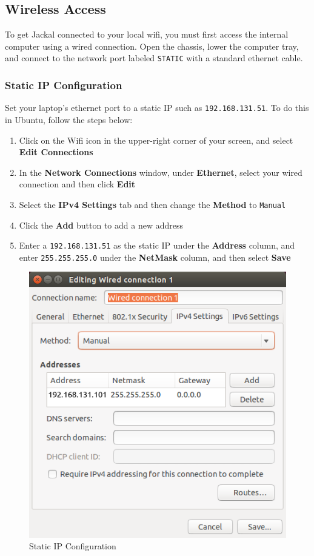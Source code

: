 \documentclass[]{clearpath-latex/clearpath-manual}
\begin{document}
\subsection{Wireless Access}

To get Jackal connected to your local wifi, you must first access the internal computer
using a wired connection. Open the chassis, lower the computer tray, and connect to the network port
labeled \lstinline{STATIC} with a standard ethernet cable.

\subsubsection{Static IP Configuration}

Set your laptop's ethernet port to a static IP such as \lstinline{192.168.131.51}.  To do this in Ubuntu, follow the steps below:
\begin{enumerate}
  \item Click on the Wifi icon in the upper-right corner of your screen, and select \textbf{Edit Connections}
  \item In the \textbf{Network Connections} window, under \textbf{Ethernet}, select your wired connection and then click \textbf{Edit}
  \item Select the \textbf{IPv4 Settings} tab and then change the \textbf{Method} to \lstinline{Manual}
  \item Click the \textbf{Add} button to add a new address
  \item Enter a \lstinline{192.168.131.51} as the static IP under the \textbf{Address} column, and enter \lstinline{255.255.255.0} under the \textbf{NetMask} column, and then select \textbf{Save}
\end{enumerate}

\begin{figure}[H]
  \centering
  \includegraphics[width=0.5\linewidth]{wired_connection.png}
  \caption{Static IP Configuration}
  \label{staticip}
\end{figure}
\end{document}
